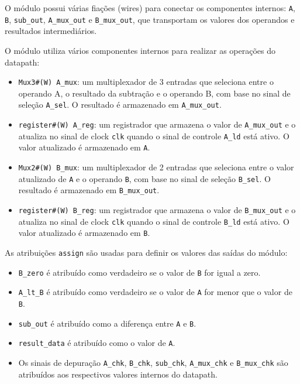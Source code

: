 \documentclass[a4paper,11pt]{article} %
\begin{document}
O módulo possui várias fiações (wires) para conectar os componentes internos: \texttt{A}, \texttt{B}, \texttt{sub\_out}, \texttt{A\_mux\_out} e \texttt{B\_mux\_out}, que transportam os valores dos operandos e resultados intermediários.

O módulo utiliza vários componentes internos para realizar as operações do datapath:

\begin{itemize}
    \item \texttt{Mux3\#(W) A\_mux}: um multiplexador de 3 entradas que seleciona entre o operando A, o resultado da subtração e o operando B, com base no sinal de seleção \texttt{A\_sel}. O resultado é armazenado em \texttt{A\_mux\_out}.
    \item \texttt{register\#(W) A\_reg}: um registrador que armazena o valor de \texttt{A\_mux\_out} e o atualiza no sinal de clock \texttt{clk} quando o sinal de controle \texttt{A\_ld} está ativo. O valor atualizado é armazenado em \texttt{A}.
    \item \texttt{Mux2\#(W) B\_mux}: um multiplexador de 2 entradas que seleciona entre o valor atualizado de \texttt{A} e o operando \texttt{B}, com base no sinal de seleção \texttt{B\_sel}. O resultado é armazenado em \texttt{B\_mux\_out}.
    \item \texttt{register\#(W) B\_reg}: um registrador que armazena o valor de \texttt{B\_mux\_out} e o atualiza no sinal de clock \texttt{clk} quando o sinal de controle \texttt{B\_ld} está ativo. O valor atualizado é armazenado em \texttt{B}.
\end{itemize}

As atribuições \texttt{assign} são usadas para definir os valores das saídas do módulo:

\begin{itemize}
    \item \texttt{B\_zero} é atribuído como verdadeiro se o valor de \texttt{B} for igual a zero.
    \item \texttt{A\_lt\_B} é atribuído como verdadeiro se o valor de \texttt{A} for menor que o valor de \texttt{B}.
    \item \texttt{sub\_out} é atribuído como a diferença entre \texttt{A} e \texttt{B}.
    \item \texttt{result\_data} é atribuído como o valor de \texttt{A}.
    \item Os sinais de depuração \texttt{A\_chk}, \texttt{B\_chk}, \texttt{sub\_chk}, \texttt{A\_mux\_chk} e \texttt{B\_mux\_chk} são atribuídos aos respectivos valores internos do datapath.
\end{itemize}
\end{document}
